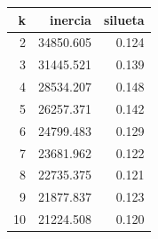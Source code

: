 \begin{tabular}{rrr}
\toprule
k & inercia & silueta \\
\midrule
2 & 34850.605 & 0.124 \\
3 & 31445.521 & 0.139 \\
4 & 28534.207 & 0.148 \\
5 & 26257.371 & 0.142 \\
6 & 24799.483 & 0.129 \\
7 & 23681.962 & 0.122 \\
8 & 22735.375 & 0.121 \\
9 & 21877.837 & 0.123 \\
10 & 21224.508 & 0.120 \\
\bottomrule
\end{tabular}
